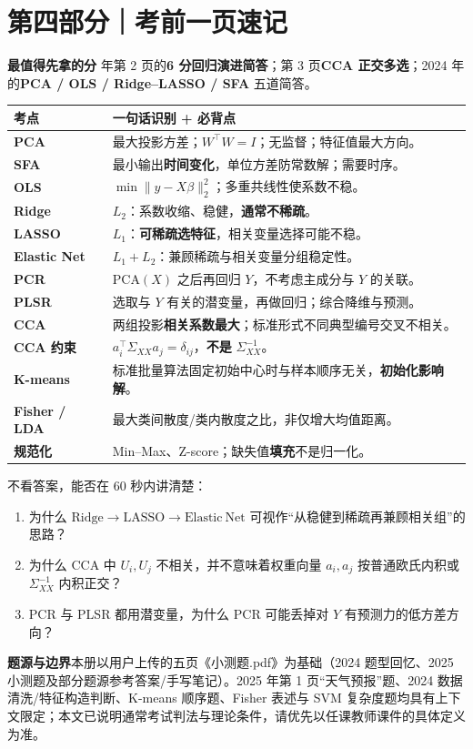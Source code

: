 \documentclass[UTF8,a4paper,11pt]{ctexart}
\newcommand{\F}[1]{{\bfseries\color{navy}#1}}
\begin{document}
\section*{第四部分｜考前一页速记}
\begin{note}
\textbf{最值得先拿的分} 年第 2 页的\textbf{6 分回归演进简答}；第 3 页\textbf{CCA 正交多选}；2024 年的\textbf{PCA / OLS / Ridge--LASSO / SFA} 五道简答。\end{note}
\noindent\begin{tabularx}{\textwidth}{>{\bfseries}p{28mm}X}
\toprule
考点 & 一句话识别 + 必背点\\ \midrule
PCA & 最大投影方差；$W^\top W=I$；无监督；特征值最大方向。\\
SFA & 最小输出\textbf{时间变化}，单位方差防常数解；需要时序。\\
OLS & $\min\|y-X\beta\|_2^2$；多重共线性使系数不稳。\\
Ridge & $L_2$：系数收缩、稳健，\textbf{通常不稀疏}。\\
LASSO & $L_1$：\textbf{可稀疏选特征}，相关变量选择可能不稳。\\
Elastic Net & $L_1+L_2$：兼顾稀疏与相关变量分组稳定性。\\
PCR & PCA$(X)$ 之后再回归 $Y$，不考虑主成分与 $Y$ 的关联。\\
PLSR & 选取与 $Y$ 有关的潜变量，再做回归；综合降维与预测。\\
CCA & 两组投影\textbf{相关系数最大}；标准形式不同典型编号交叉不相关。\\
CCA 约束 & $a_i^\top\Sigma_{XX}a_j=\delta_{ij}$，\textbf{不是} $\Sigma_{XX}^{-1}$。\\
K-means & 标准批量算法固定初始中心时与样本顺序无关，\textbf{初始化影响解}。\\
Fisher / LDA & 最大类间散度/类内散度之比，非仅增大均值距离。\\
规范化 & Min--Max、Z-score；缺失值\textbf{填充}不是归一化。\\
\bottomrule
\end{tabularx}
\vspace{8pt}
\noindent\F{考前最后 3 个口述题}\quad 不看答案，能否在 60 秒内讲清楚：
\begin{enumerate}
\item 为什么 $\mathrm{Ridge}\to\mathrm{LASSO}\to\mathrm{Elastic\ Net}$ 可视作“从稳健到稀疏再兼顾相关组”的思路？
\item 为什么 CCA 中 $U_i,U_j$ 不相关，并不意味着权重向量 $a_i,a_j$ 按普通欧氏内积或 $\Sigma_{XX}^{-1}$ 内积正交？
\item PCR 与 PLSR 都用潜变量，为什么 PCR 可能丢掉对 $Y$ 有预测力的低方差方向？
\end{enumerate}
\vspace{4pt}
\begin{note}
\textbf{题源与边界}\quad 本册以用户上传的五页《小测题.pdf》为基础（2024 题型回忆、2025 小测题及部分题源参考答案/手写笔记）。2025 年第 1 页“天气预报”题、2024 数据清洗/特征构造判断、K-means 顺序题、Fisher 表述与 SVM 复杂度题均具有上下文限定；本文已说明通常考试判法与理论条件，请优先以任课教师课件的具体定义为准。\end{note}
\end{document}
